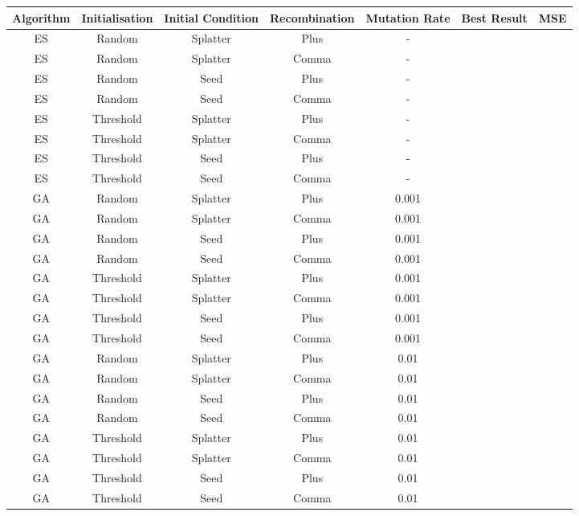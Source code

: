 \begin{table}
    \centering\hfill
        \begin{tabular}{|c|c|c|c|c|c|c|}
            \hline
            Algorithm & Initialisation & Initial Condition & Recombination & Mutation Rate & Best Result & MSE \\
            \hline
            ES & Random  & Splatter & Plus & - & &  \\
            ES & Random  & Splatter & Comma & - & &  \\
            ES & Random  & Seed & Plus & - & &  \\
            ES & Random  & Seed & Comma & - & &  \\
            ES & Threshold  & Splatter & Plus & - & &  \\
            ES & Threshold  & Splatter & Comma & - & &  \\
            ES & Threshold  & Seed & Plus & - & &  \\
            ES & Threshold  & Seed & Comma & - & &  \\
            GA & Random  & Splatter & Plus & 0.001 & &  \\
            GA & Random  & Splatter & Comma & 0.001 & &  \\
            GA & Random  & Seed & Plus & 0.001 & &  \\
            GA & Random  & Seed & Comma & 0.001 & &  \\
            GA & Threshold  & Splatter & Plus & 0.001 & &  \\
            GA & Threshold  & Splatter & Comma & 0.001 & &  \\
            GA & Threshold  & Seed & Plus & 0.001 & &  \\
            GA & Threshold  & Seed & Comma & 0.001 & &  \\
            GA & Random  & Splatter & Plus & 0.01 & &  \\
            GA & Random  & Splatter & Comma & 0.01 & &  \\
            GA & Random  & Seed & Plus & 0.01 & &  \\
            GA & Random  & Seed & Comma & 0.01 & &  \\
            GA & Threshold  & Splatter & Plus & 0.01 & &  \\
            GA & Threshold  & Splatter & Comma & 0.01 & &  \\
            GA & Threshold  & Seed & Plus & 0.01 & &  \\
            GA & Threshold  & Seed & Comma & 0.01 & &  \\

\end{tabular}
\end{table}
